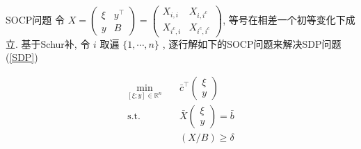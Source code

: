 \documentclass[slidestop,compress,mathserif,UTF8]{beamer}
\numberwithin{equation}{section}
\begin{document}
            \begin{frame}[t]{SOCP问题}
                令
                $
                        X
                    =	\begin{pmatrix}
                            \xi & y^\top \\
                            y & B
                        \end{pmatrix}
                    =	\begin{pmatrix}
                            X_{i, i} & X_{i, i^c} \\
                            X_{i^c, i} & X_{i^c, i^c}
                        \end{pmatrix}
                $,
                等号在相差一个初等变化下成立. 基于Schur补, 令 $i$ 取遍 $\{1, \cdots, n\}$ , 逐行解如下的SOCP问题来解决SDP问题(\ref{SDP})

                \begin{equation}
                    \begin{split}\label{SOCP}
                        \min_{[\xi; y] \in \mathbb{R}^{n}} \quad
                            & \bar{c}^\top \begin{pmatrix}\xi \\ y\end{pmatrix}\\
                        \text{s.t.} \quad
                            & \bar{X} \begin{pmatrix}\xi \\ y\end{pmatrix} = \bar{b}\\
                            & (X/B) \geq \delta
                    \end{split}
                \end{equation}
            \end{frame}
\end{document}
